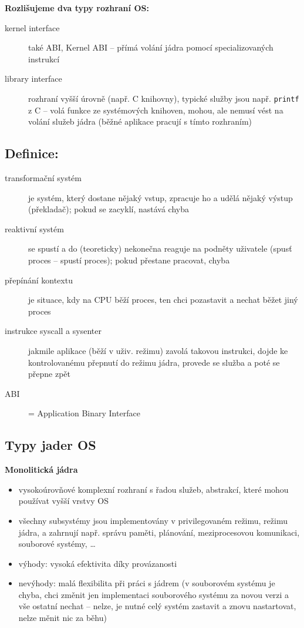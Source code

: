 \documentclass[a4paper, 11pt]{article}
\begin{document}
\textbf{Rozlišujeme dva typy rozhraní OS:} \label{kernel-interfaces}
\begin{description}
    \item[kernel interface] také ABI, Kernel ABI -- přímá volání jádra pomocí specializovaných instrukcí
    \item[library interface] rozhraní vyšší úrovně (např. C knihovny), typické služby jsou např. \verb|printf| z C -- volá funkce ze systémových knihoven, mohou, ale nemusí vést na volání služeb jádra (běžné aplikace pracují s tímto rozhraním)
\end{description}

\subsection*{Definice:} \label{prepinani-kontextu-jadro}
\begin{description}
\item[transformační systém] je systém, který dostane nějaký vstup, zpracuje ho a udělá nějaký výstup (překladač); pokud se zacyklí, nastává chyba

\item[reaktivní systém] se spustí a do (teoreticky) nekonečna reaguje na podněty uživatele (spusť proces -- spustí proces); pokud přestane pracovat, chyba

\item[přepínání kontextu] je situace, kdy na CPU běží proces, ten chci pozastavit a nechat běžet jiný proces

\item[instrukce syscall a sysenter] jakmile aplikace (běží v uživ. režimu) zavolá takovou instrukci, dojde ke kontrolovanému přepnutí do režimu jádra, provede se služba a poté se přepne zpět

\item[ABI] = Application Binary Interface
\end{description}

\newpage

\subsection{Typy jader OS}
\textbf{Monolitická jádra}
\begin{itemize}
    \item vysokoúrovňové komplexní rozhraní s řadou služeb, abstrakcí, které mohou používat vyšší vrstvy OS
    \item všechny subsystémy jsou implementovány v privilegovaném režimu, režimu jádra, a zahrnují např. správu paměti, plánování, meziprocesovou komunikaci, souborové systémy, \ldots
    \item výhody: vysoká efektivita díky provázanosti
    \item nevýhody: malá flexibilita při práci s jádrem (v souborovém systému je chyba, chci změnit jen implementaci souborového systému za novou verzi a vše ostatní nechat -- nelze, je nutné celý systém zastavit a znovu nastartovat, nelze měnit nic za běhu)
\end{itemize}
\end{document}
